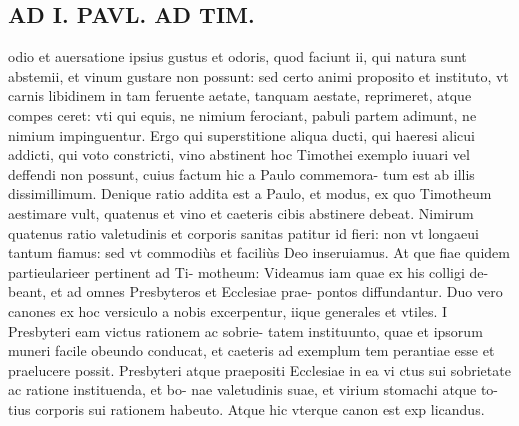 \documentclass{article}
\begin{document}
\begin{pages}
\section*{AD I. PAVL. AD TIM. }\pstart odio et auersatione ipsius gustus et odoris, quod faciunt ii, qui natura sunt abstemii, et vinum gustare non possunt: sed certo animi proposito et instituto, vt carnis libidinem in tam feruente aetate, tanquam aestate, reprimeret, atque compes ceret: vti qui equis, ne nimium ferociant, pabuli partem adimunt, ne nimium impinguentur.  \pend\pstart Ergo qui superstitione aliqua ducti, qui haeresi alicui addicti, qui voto constricti, vino abstinent hoc Timothei exemplo iuuari vel deffendi non possunt, cuius factum hic a Paulo commemora- tum est ab illis dissimillimum.  \pend\pstart Denique ratio addita est a Paulo, et modus, ex quo Timotheum aestimare vult, quatenus et vino et caeteris cibis abstinere debeat. Nimirum quatenus ratio valetudinis et corporis sanitas patitur id fieri: non vt longaeui tantum fiamus: sed vt commodiùs et faciliùs Deo inseruiamus. At que fiae quidem partieularieer pertinent ad Ti- motheum: Videamus iam quae ex his colligi de- beant, et ad omnes Presbyteros et Ecclesiae prae- pontos diffundantur. Duo vero canones ex hoc versiculo a nobis excerpentur, iique generales et vtiles.  \pend\pstart I Presbyteri eam victus rationem ac sobrie- tatem instituunto, quae et ipsorum muneri facile obeundo conducat, et caeteris ad exemplum tem perantiae esse et praelucere possit.  \pend{} Presbyteri atque praepositi Ecclesiae in ea vi ctus sui sobrietate ac ratione instituenda, et bo- nae valetudinis suae, et virium stomachi atque to- tius corporis sui rationem habeuto.  \pend\pstart Atque hic vterque canon est exp licandus.  \pend

\end{pages}
\end{document}

